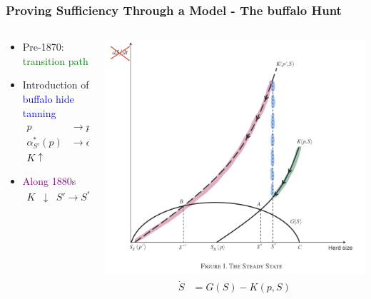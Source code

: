 \documentclass[aspectratio=169, 12pt, final]{beamer}
\begin{document}
\begin{frame}
\frametitle{Proving Sufficiency Through a Model - The buffalo Hunt}
\begin{columns}
\begin{column}{0.6\textwidth}
\begin{itemize}
	\item Pre-1870: \textcolor{green}{transition path}
	\item Introduction of \textcolor{blue}{buffalo hide tanning}
	\begin{align*}
		p &\to p' & p' > p\\
		\alpha_{S'}^*(p) & \to \alpha_{S'}^*(p') & \alpha^*(p') < \alpha^*(p)  \\
		K \uparrow
	\end{align*}
	\item \textcolor{purple}{Along 1880s}
	\begin{align*}
	 	K & \downarrow & S' \to \underbrace{S^{*'} \to S_s(p')}_{\text{extinction}}
	 \end{align*} 
\end{itemize}

\end{column}
\begin{column}{0.5\textwidth} 
    \begin{center}
     \includegraphics[width=1\textwidth]{Figure1b.jpeg}
     \begin{align*}
	\dot{S} &= G(S) - K(p, S)
\end{align*}
     \end{center}
\end{column}
\end{columns}
\end{frame}
\end{document}
